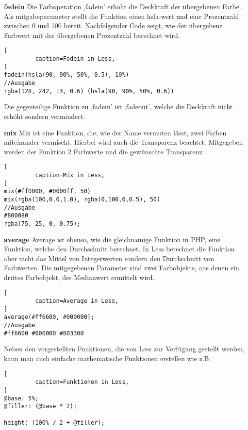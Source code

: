 \textbf{fadein}\newline
Die Farboperation ,fadein' erhöht die Deckkraft der übergebenen Farbe. Als mitgabeparameter stellt die Funktion einen hsla-wert und eine Prozentzahl zwischen 0 und 100 bereit. Nachfolgender Code zeigt, wie der übergebene Farbwert mit der übergebenen Prozentzahl berechnet wird. \newpage
\begin{lstlisting}[
         caption=Fadein in Less,
]
fadein(hsla(90, 90%, 50%, 0.5), 10%)
//Ausgabe
rgba(128, 242, 13, 0.6) (hsla(90, 90%, 50%, 0.6))
\end{lstlisting}
Die gegenteilige Funktion zu ,fadein' ist ,fadeout', welche die Deckkraft nicht erhöht sondern vermindert.

\textbf{mix}\newline
Mix ist eine Funktion, die, wie der Name vermuten lässt, zwei Farben miteinander vermischt. Hierbei wird auch die Transparenz beachtet. Mitgegeben werden der Funktion 2 Farbwerte und die gewünschte Transparenz.
\begin{lstlisting}[
         caption=Mix in Less,
]
mix(#ff0000, #0000ff, 50)
mix(rgba(100,0,0,1.0), rgba(0,100,0,0.5), 50)
//Ausgabe
#800080
rgba(75, 25, 0, 0.75);
\end{lstlisting}

\textbf{average}\newline
Average ist ebenso, wie die gleichnamige Funktion in PHP, eine Funktion, welche den Durchschnitt berechnet. In Less berechnet die Funktion aber nicht das Mittel von Integerwerten sondern den Durchschnitt von Farbwerten. Die mitgegebenen Parameter sind zwei Farbobjekte, aus denen ein drittes Farbobjekt, der Medianwert ermittelt wird.
\begin{lstlisting}[
         caption=Average in Less,
]
average(#ff6600, #000000);
//Ausgabe
#ff6600 #000000 #803300
\end{lstlisting}
\autocite[]{Sellier.2013}

Neben den vorgestellten Funktionen, die von Less zur Verfügung gestellt werden, kann man auch einfache mathematische Funktionen erstellen wie z.B.
\begin{lstlisting}[
         caption=Funktionen in Less,
]
@base: 5%;
@filler: (@base * 2);

height: (100% / 2 + @filler);
\end{lstlisting}
\newpage
